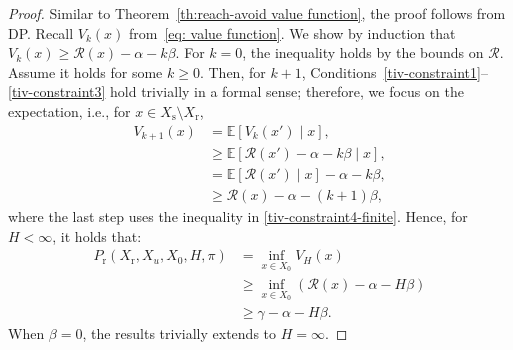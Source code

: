 \documentclass[journal,twoside,web]{ieeecolor}
\newcommand{\unsafe}{\mathrm{u}}
\newcommand{\safe}{\mathrm{s}}
\newcommand{\reach}{\mathrm{r}}
\newcommand{\hor}{H}
\newcommand{\RA}{\mathcal{R}}
\newcommand{\Pfin}{P_{\reach}(X_{\reach}, X_u, X_0, \hor, \pi)}
\theoremstyle{definition}
\theoremstyle{plain}
\theoremstyle{plain}
\begin{document}
\begin{proof}
Similar to Theorem~\ref{th:reach-avoid value function}, the proof follows from DP. 
Recall $V_k(x)$ from~\eqref{eq: value function}.
We show by induction that $V_k(x) \ge \RA(x) - \alpha - k\beta$. For $k=0$, the inequality holds by the bounds on $\RA$. Assume it holds for some $k \ge 0$. 
Then, for $k+1$, Conditions~\eqref{tiv-constraint1}–\eqref{tiv-constraint3} hold trivially in a formal sense; therefore, we focus on the expectation, i.e., for $x \in X_\safe \setminus X_\reach$,
\begin{align*}
   V_{k+1}(x) & = \mathbb{E}[V_k(x') \mid x], \\
   & \ge \mathbb{E}[\RA(x') - \alpha - k\beta \mid x], \\
   & = \mathbb{E}[\RA(x') \mid x] -  \alpha - k\beta, \\
   & \ge \RA(x) - \alpha - (k+1) \beta,
\end{align*}
where the last step uses the inequality in \eqref{tiv-constraint4-finite}. 
Hence, for $H < \infty$, it holds that:
\begin{align*}
\Pfin & = \inf_{x \in X_0} V_H(x) \\ 
& \ge \inf_{x \in X_0} (\RA(x) - \alpha - \hor \beta) \\
& \ge \gamma - \alpha - \hor \beta.
\end{align*}
When $\beta=0$, the results trivially extends to $H = \infty$.
\end{proof}

\end{document}
